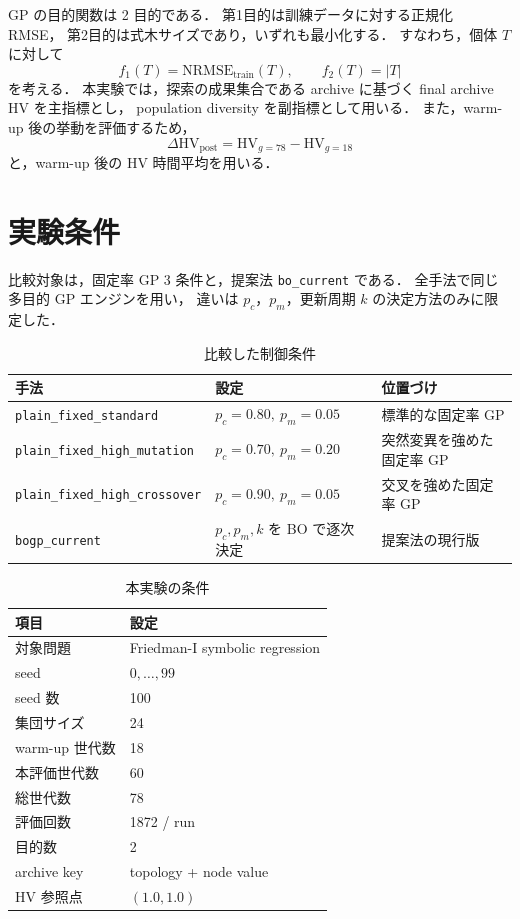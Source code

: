 \documentclass[a4paper,11pt]{ltjsarticle}
\newcommand{\HV}{\mathrm{HV}}
\begin{document}
GP の目的関数は 2 目的である．
第1目的は訓練データに対する正規化 RMSE，
第2目的は式木サイズであり，いずれも最小化する．
すなわち，個体 \(T\) に対して
\[
  f_1(T)=\mathrm{NRMSE}_{\mathrm{train}}(T),
  \qquad
  f_2(T)=|T|
\]
を考える．
本実験では，探索の成果集合である archive に基づく final archive \(\HV\) を主指標とし，
population diversity を副指標として用いる．
また，warm-up 後の挙動を評価するため，
\[
  \Delta \HV_{\mathrm{post}}
  =
  \HV_{g=78}
  -
  \HV_{g=18}
\]
と，warm-up 後の \(\HV\) 時間平均を用いる．

\section{実験条件}

比較対象は，固定率 GP 3 条件と，提案法 \texttt{bo\_current} である．
全手法で同じ多目的 GP エンジンを用い，
違いは \(p_c\)，\(p_m\)，更新周期 \(k\) の決定方法のみに限定した．

\begin{table}[htbp]
\centering
\caption{比較した制御条件}
\label{tab:main-methods}
\begin{tabular}{lll}
\toprule
手法 & 設定 & 位置づけ \\
\midrule
\texttt{plain\_fixed\_standard} & \(p_c=0.80,\ p_m=0.05\) & 標準的な固定率 GP \\
\texttt{plain\_fixed\_high\_mutation} & \(p_c=0.70,\ p_m=0.20\) & 突然変異を強めた固定率 GP \\
\texttt{plain\_fixed\_high\_crossover} & \(p_c=0.90,\ p_m=0.05\) & 交叉を強めた固定率 GP \\
\texttt{bogp\_current} & \(p_c,p_m,k\) を BO で逐次決定 & 提案法の現行版 \\
\bottomrule
\end{tabular}
\end{table}

\begin{table}[htbp]
\centering
\caption{本実験の条件}
\label{tab:main-setting}
\begin{tabular}{ll}
\toprule
項目 & 設定 \\
\midrule
対象問題 & Friedman-I symbolic regression \\
seed & \(0,\ldots,99\) \\
seed 数 & 100 \\
集団サイズ & 24 \\
warm-up 世代数 & 18 \\
本評価世代数 & 60 \\
総世代数 & 78 \\
評価回数 & 1872 / run \\
目的数 & 2 \\
archive key & topology + node value \\
HV 参照点 & \((1.0,1.0)\) \\
\bottomrule
\end{tabular}
\end{table}
\end{document}
